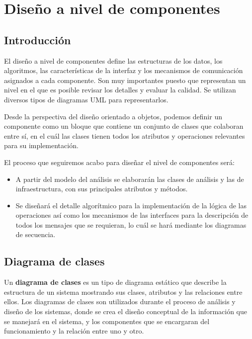 

	\section{Diseño a nivel de componentes} %
	\label{sec:componentes}
	
	\subsection{Introducción} %
		\label{sub:comp_introduccion}
	
		El diseño a nivel de componentes define las estructuras de los datos, los algoritmos, las características de la interfaz y los mecanismos de comunicación asignados a cada componente. Son muy importantes puesto que representan un nivel en el que es posible revisar los detalles y evaluar la calidad. Se utilizan diversos tipos de diagramas UML para representarlos.
		
		Desde la perspectiva del diseño orientado a objetos, podemos definir  un componente como un bloque que contiene un conjunto de clases que colaboran entre sí, en el cuál las clases tienen todos los atributos y operaciones relevantes para su implementación.
		
		El proceso que seguiremos acabo para diseñar el nivel de componentes será:
		\begin{itemize}
			\item A partir del modelo del análisis se elaborarán las clases de análisis y las de infraestructura, con sus principales atributos y métodos.
			\item Se diseñará el detalle algorítmico para la implementación de la lógica de las operaciones así como los mecanismos de las interfaces para la descripción de todos los mensajes que se requieran, lo cuál se hará mediante los diagramas de secuencia.
		\end{itemize}
	
	
	\subsection{Diagrama de clases} %
		\label{sec:diagrama_de_clases}

			Un \textbf{diagrama de clases} es un tipo de diagrama estático que describe la estructura de un sistema mostrando sus clases, atributos y las relaciones entre ellos. Los diagramas de clases son utilizados durante el proceso de análisis y diseño de los sistemas, donde se crea el diseño conceptual de la información que se manejará en el sistema, y los componentes que se encargaran del funcionamiento y la relación entre uno y otro.

